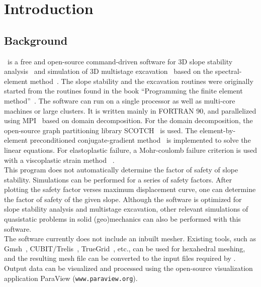 \chapter{Introduction}
\label{chap:intro}
\section{Background}

\pack\ is a free and open-source command-driven software for 3D slope stability analysis~\citep[for more details see][]{gharti2012a} and simulation of 3D multistage excavation~\citep[for more details see][]{gharti2012b} based on the spectral-element method~\citep[e.g.,][]{patera1984,canuto1988,seriani1994,faccioli1997,komatitsch1998,komatitsch1999,peter2011}. The slope stability and the excavation routines were originally started from the routines found in the book ``Programming the finite element method''~\citep{smith2004}. The software can run on a single processor as well as multi-core machines or large clusters. It is written mainly in FORTRAN 90, and parallelized using
MPI~\citep{gropp1994,pacheco1997} based on domain decomposition. For the domain decomposition, the open-source graph partitioning library SCOTCH~\citep{pellegrini1996} is used. The element-by-element preconditioned conjugate-gradient method~\citep[e.g.,][]{hughes1983,law1986,king1987,barragy1988} is implemented to solve the linear equations. For elastoplastic failure,
a Mohr-coulomb failure criterion is used with a viscoplastic strain method~ \citep{zienkiewicz1974}.\\

This program does not automatically determine the factor of safety of slope stability. Simulations can be performed for a series of safety factors. After plotting the safety factor verses maximum displacement curve, one can determine the factor of safety of the given slope. Although the software is optimized for slope stability analysis and multistage excavation, other relevant simulations of quasistatic problems in solid (geo)mechanics can also be performed with this software.\\

The software currently does not include an inbuilt mesher. Existing tools, such as Gmsh~\citep{geuzaine2009}, CUBIT/Trelis~\citep{cubit2011}, TrueGrid~\citep{truegrid2006}, etc., can be used for hexahedral meshing, and the resulting mesh file can be converted to the input files required by \pack. Output data can be visualized and processed using the open-source visualization application ParaView (\texttt{www.paraview.org}).

